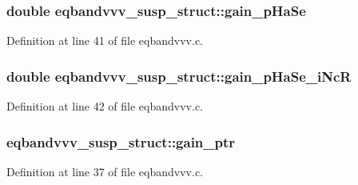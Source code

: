\subsubsection[{\texorpdfstring{gain\+\_\+p\+Ha\+Se}{gain_pHaSe}}]{\setlength{\rightskip}{0pt plus 5cm}double eqbandvvv\+\_\+susp\+\_\+struct\+::gain\+\_\+p\+Ha\+Se}\hypertarget{structeqbandvvv__susp__struct_a9e29ebf635c585ce7950e79916d4e466}{}\label{structeqbandvvv__susp__struct_a9e29ebf635c585ce7950e79916d4e466}


Definition at line 41 of file eqbandvvv.\+c.

\subsubsection[{\texorpdfstring{gain\+\_\+p\+Ha\+Se\+\_\+i\+NcR}{gain_pHaSe_iNcR}}]{\setlength{\rightskip}{0pt plus 5cm}double eqbandvvv\+\_\+susp\+\_\+struct\+::gain\+\_\+p\+Ha\+Se\+\_\+i\+NcR}\hypertarget{structeqbandvvv__susp__struct_a5bb8586f835505ae614ab1a48b99859c}{}\label{structeqbandvvv__susp__struct_a5bb8586f835505ae614ab1a48b99859c}


Definition at line 42 of file eqbandvvv.\+c.

\subsubsection[{\texorpdfstring{gain\+\_\+ptr}{gain_ptr}}]{ eqbandvvv\+\_\+susp\+\_\+struct\+::gain\+\_\+ptr}\hypertarget{structeqbandvvv__susp__struct_a67fcdff014d3b9787d0a274ab28353f1}{}\label{structeqbandvvv__susp__struct_a67fcdff014d3b9787d0a274ab28353f1}


Definition at line 37 of file eqbandvvv.\+c.


